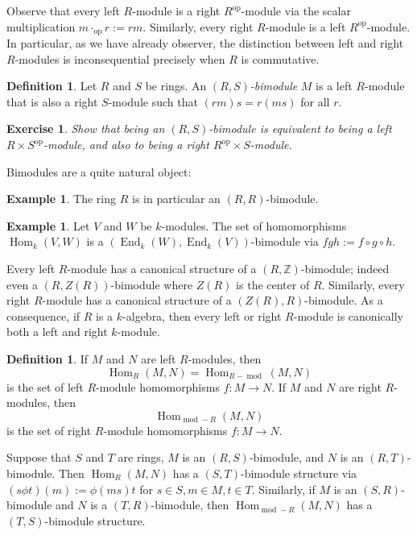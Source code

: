 \documentclass[12pt]{article}
\theoremstyle{plain}
\newtheorem{exercise}[theorem]{Exercise}
\theoremstyle{definition}
\newtheorem{definition}[theorem]{Definition}
\newtheorem{example}[theorem]{Example}
\theoremstyle{remark}
\numberwithin{equation}{section}
\begin{document}
Observe that every left $R$-module is a right $R^{\mathrm{op}}$-module
via the scalar multiplication $m \cdot_{\mathrm{op}} r := rm$.
Similarly, every right $R$-module is a left $R^{\mathrm{op}}$-module.
In particular, as we have already observer,
the distinction between left and right
$R$-modules is inconsequential precisely when $R$ is commutative.

\begin{definition}
Let $R$ and $S$ be rings.  An \emph{$(R,S)$-bimodule} $M$ is a left
$R$-module that is also a right $S$-module such that $(rm)s=r(ms)$ for
all $r$.
\end{definition}

\begin{exercise}
Show that being an $(R,S)$-bimodule is equivalent to being a
left $R \times S^{\mathrm{op}}$-module, and also to being
a right $R^{\mathrm{op}} \times S$-module.
\end{exercise}

Bimodules are a quite natural object:

\begin{example}
The ring $R$ is in particular an $(R,R)$-bimodule.
\end{example}

\begin{example}
Let $V$ and $W$ be $k$-modules.  The set of homomorphisms
$\operatorname{Hom}_k(V,W)$ is a
$(\operatorname{End}_k(W),\operatorname{End}_k(V))$-bimodule
via $fgh := f \circ g \circ h$.
\end{example}

Every left $R$-module has a canonical structure of a
$(R,\mathbb{Z})$-bimodule; indeed even a $(R,Z(R))$-bimodule where
$Z(R)$ is the center of $R$.
Similarly, every right $R$-module has a canonical structure of
a $(Z(R),R)$-bimodule.
As a consequence, if $R$ is a $k$-algebra, then every left or right
$R$-module is canonically both a left and right $k$-module.

\begin{definition}
If $M$ and $N$ are left $R$-modules, then
\[
\operatorname{Hom}_R(M,N) = \operatorname{Hom}_{R-\operatorname{mod}}(M,N)
\]
is the set of left $R$-module homomorphisms $f : M \to N$.
If $M$ and $N$ are right $R$-modules, then
\[
\operatorname{Hom}_{\operatorname{mod}-R}(M,N)
\]
is the set of right $R$-module homomorphisms $f : M \to N$.
\end{definition}

Suppose that $S$ and $T$ are rings,
$M$ is an $(R,S)$-bimodule, and $N$ is an $(R,T)$-bimodule.
Then $\operatorname{Hom}_R(M,N)$ has a $(S,T)$-bimodule structure
via $(s\phi t)(m):=\phi(ms)t$ for $s \in S, m \in M, t\in T$.
Similarly, if $M$ is an $(S,R)$-bimodule and $N$ is a $(T,R)$-bimodule,
then $\operatorname{Hom}_{\operatorname{mod}-R}(M,N)$
has a $(T,S)$-bimodule structure.
\end{document}
